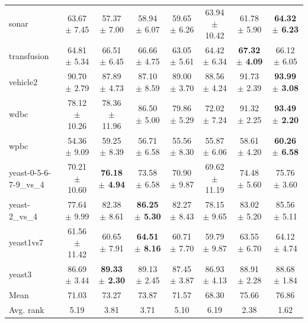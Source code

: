 \begin{table}[t]
\begin{tabular}{lccccccc}
sonar & 63.67 $\pm$ 7.45 & 57.37 $\pm$ 7.00 & 58.94 $\pm$ 6.07 & 59.65 $\pm$ 6.26 & 63.94 $\pm$ 10.42 & 61.78 $\pm$ 5.90 & \textbf{64.32 $\pm$ 6.23} \\
transfusion & 64.81 $\pm$ 5.34 & 66.51 $\pm$ 6.45 & 66.66 $\pm$ 4.75 & 63.05 $\pm$ 5.61 & 64.42 $\pm$ 6.34 & \textbf{67.32 $\pm$ 4.09} & 66.12 $\pm$ 6.05 \\
vehicle2 & 90.70 $\pm$ 2.79 & 87.89 $\pm$ 4.73 & 87.10 $\pm$ 8.59 & 89.00 $\pm$ 3.70 & 88.56 $\pm$ 4.24 & 91.73 $\pm$ 2.39 & \textbf{93.99 $\pm$ 3.08} \\
wdbc & 78.12 $\pm$ 10.26 & 78.36 $\pm$ 11.96 & 86.50 $\pm$ 5.00 & 79.86 $\pm$ 5.29 & 72.02 $\pm$ 7.24 & 91.32 $\pm$ 2.25 & \textbf{93.49 $\pm$ 2.20} \\
wpbc & 54.36 $\pm$ 9.09 & 59.25 $\pm$ 8.39 & 56.71 $\pm$ 6.58 & 55.56 $\pm$ 8.30 & 55.87 $\pm$ 6.06 & 58.61 $\pm$ 4.20 & \textbf{60.26 $\pm$ 6.58} \\
yeast-0-5-6-7-9\_vs\_4 & 70.21 $\pm$ 10.60 & \textbf{76.18 $\pm$ 4.94} & 73.58 $\pm$ 6.58 & 70.90 $\pm$ 9.87 & 69.62 $\pm$ 11.19 & 74.48 $\pm$ 5.60 & 75.76 $\pm$ 3.60 \\
yeast-2\_vs\_4 & 77.64 $\pm$ 9.99 & 82.38 $\pm$ 8.61 & \textbf{86.25 $\pm$ 5.30} & 82.27 $\pm$ 8.43 & 78.15 $\pm$ 9.65 & 83.02 $\pm$ 5.20 & 85.56 $\pm$ 5.11 \\
yeast1vs7 & 61.56 $\pm$ 11.42 & 60.65 $\pm$ 7.91 & \textbf{64.51 $\pm$ 8.16} & 60.71 $\pm$ 7.70 & 59.79 $\pm$ 9.87 & 63.55 $\pm$ 6.70 & 64.12 $\pm$ 4.74 \\
yeast3 & 86.69 $\pm$ 3.44 & \textbf{89.33 $\pm$ 2.30} & 89.13 $\pm$ 2.45 & 87.45 $\pm$ 3.87 & 86.93 $\pm$ 4.13 & 88.91 $\pm$ 2.28 & 88.68 $\pm$ 1.84 \\
\midrule
Mean & 71.03 & 73.27 & 73.87 & 71.57 & 68.30 & 75.66 & 76.86 \\
Avg. rank & 5.19 & 3.81 & 3.71 & 5.10 & 6.19 & 2.38 & 1.62 \\
\bottomrule
\end{tabular}
\end{table}